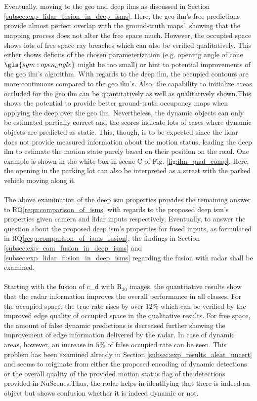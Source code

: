 \\\\
Eventually, moving to the geo and deep \gls{ilm}s as discussed in Section \ref{subsec:exp_lidar_fusion_in_deep_isms}. Here, the geo \gls{ilm}'s free predictions provide almost perfect overlap with the ground-truth maps', showing that the mapping process does not alter the free space much. However, the occupied space shows lots of free space ray breaches which can also be verified qualitatively. This either shows deficits of the chosen parameterization (e.g. opening angle of cone $\gls{sym:open_angle}$ might be too small) or hint to potential improvements of the geo \gls{ilm}'s algorithm. With regards to the deep \gls{ilm}, the occupied contours are more continuous compared to the geo \gls{ilm}'s. Also, the capability to initialize areas occluded for the geo \gls{ilm} can be quantitatively as well as qualitatively shown.This shows the potential to provide better ground-truth occupancy maps when applying the deep over the geo \gls{ilm}. Nevertheless, the dynamic objects can only be estimated partially correct and the scores indicate lots of cases where dynamic objects are predicted as static. This, though, is to be expected since the lidar does not provide measured information about the motion status, leading the deep \gls{ilm} to estimate the motion state purely based on their position on the road. One example is shown in the white box in scene C of Fig. \ref{fig:ilm_qual_comp}. Here, the opening in the parking lot can also be interpreted as a street with the parked vehicle moving along it.
\\\\
The above examination of the deep \gls{ism} properties provides the remaining answer to RQ\ref{requ:comparison_of_isms} with regards to the proposed deep \gls{ism}'s properties given camera and lidar inputs respectively. Eventually, to answer the question about the proposed deep \gls{ism}'s properties for fused inputs, as formulated in RQ\ref{requ:comparison_of_isms_fusion}, the findings in Section \ref{subsec:exp_cam_fusion_in_deep_isms} and \ref{subsec:exp_lidar_fusion_in_deep_isms} regarding the fusion with radar shall be examined.
\\\\
Starting with the fusion of \gls{c_d} with R$_{20}$ images, the quantitative results show that the radar information improves the overall performance in all classes. For the occupied space, the true rate rises by over $12\%$ which can be verified by the improved edge quality of occupied space in the qualitative results. For free space, the amount of false dynamic predictions is decreased further showing the improvement of edge information delivered by the radar. In case of dynamic areas, however, an increase in $5\%$ of false occupied rate can be seen. This problem has been examined already in Section \ref{subsec:exp_results_aleat_uncert} and seems to originate from either the proposed encoding of dynamic detections or the overall quality of the provided motion status flag of the detections provided in NuScenes.Thus, the radar helps in identifying that there is indeed an object but shows confusion whether it is indeed dynamic or not.  
